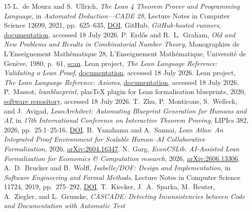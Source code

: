 \documentclass[11pt]{article}
\begin{document}
{\footnotesize
\begin{thebibliography}{15}
\setlength{\itemsep}{0pt}
\setlength{\parsep}{0pt}
 L.~de Moura and S.~Ullrich, \emph{The Lean 4 Theorem Prover
and Programming Language}, in \emph{Automated Deduction---CADE 28}, Lecture
Notes in Computer Science 12699, 2021,
pp.~625--635,
\href{https://doi.org/10.1007/978-3-030-79876-5_37}{DOI}.
 GitHub, \emph{GitHub-hosted runners},
\href{https://docs.github.com/actions/concepts/runners/github-hosted-runners}{documentation},
accessed 18 July 2026.
 P.~Erd\H{o}s and R.~L.~Graham, \emph{Old and New
Problems and Results in Combinatorial Number Theory}, Monographies de
L'Enseignement Math\'ematique 28, L'Enseignement Math\'ematique, Universit\'e
de Gen\`eve, 1980, p.~61,
\href{https://mathweb.ucsd.edu/~ronspubs/80_11_number_theory.pdf}{scan}.
 Lean project, \emph{The Lean Language Reference: Validating
a Lean Proof},
\href{https://lean-lang.org/doc/reference/latest/ValidatingProofs/}{documentation},
accessed 18 July 2026.
 Lean project, \emph{The Lean Language Reference: Axioms},
\href{https://lean-lang.org/doc/reference/latest/Axioms/}{documentation},
accessed 18 July 2026.
 P.~Massot, \emph{leanblueprint}, plasTeX plugin for
Lean formalisation blueprints, 2020,
\href{https://github.com/PatrickMassot/leanblueprint}{software repository},
accessed 18 July 2026.
 T.~Zhu, P.~Monticone, S.~Welleck, and J.~Avigad,
\emph{LeanArchitect: Automating Blueprint Generation for Humans and AI},
in \emph{17th International Conference on Interactive Theorem Proving},
LIPIcs 382, 2026, pp.~25:1--25:16,
\href{https://doi.org/10.4230/LIPIcs.ITP.2026.25}{DOI}.
 B.~Yanahama and A.~Sannai, \emph{Lean Atlas: An
Integrated Proof Environment for Scalable Human--AI Collaborative
Formalization}, 2026,
\href{https://doi.org/10.48550/arXiv.2604.16347}{arXiv:2604.16347}.
 N.~Garg, \emph{EconCSLib: AI-Assisted Lean Formalization for
Economics \& Computation research}, 2026,
\href{https://doi.org/10.48550/arXiv.2606.13306}{arXiv:2606.13306}.
 A.~D.~Brucker and B.~Wolff, \emph{Isabelle/DOF: Design and
Implementation}, in \emph{Software Engineering and Formal Methods}, Lecture
Notes in Computer Science 11724, 2019, pp.~275--292,
\href{https://doi.org/10.1007/978-3-030-30446-1_15}{DOI}.
 T.~Kiecker, J.~A.~Sparka, M.~Reuter, A.~Ziegler, and
L.~Grunske, \emph{CASCADE: Detecting
Inconsistencies between Code and Documentation with Automatic Test
}
\end{thebibliography}}
\end{document}
